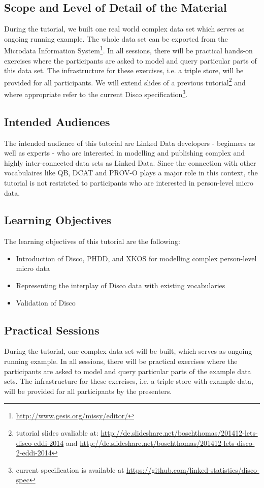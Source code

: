 \documentclass{llncs}
\begin{document}
\subsection{Scope and Level of Detail of the Material}

During the tutorial, we built one real world complex data set which serves as ongoing running example. 
The whole data set can be exported from the Microdata Information System\footnote{\url{http://www.gesis.org/missy/editor/}}. 
In all sessions, there will be practical hands-on exercises where the participants are asked to model and query particular parts of this data set. 
The infrastructure for these exercises, i.e. a triple store, will be provided for all participants.
We will extend slides of a previous tutorial\footnote{tutorial slides avaliable at: \url{http://de.slideshare.net/boschthomas/201412-lets-disco-eddi-2014} and \url{http://de.slideshare.net/boschthomas/201412-lets-disco-2-eddi-2014}} 
and where appropriate refer to the current Disco specification\footnote{current specification is available at \url{https://github.com/linked-statistics/disco-spec}}.

\subsection{Intended Audiences}
The intended audience of this tutorial are Linked Data developers - beginners as well as experts - who are interested in modelling and publishing complex and highly inter-connected data sets as Linked Data. Since the connection with other vocabulaires like QB, DCAT and PROV-O plays a major role in this context, the tutorial is not restricted to participants who are interested in person-level micro data.

\subsection{Learning Objectives}
The learning objectives of this tutorial are the following:
\begin{itemize} 
\item Introduction of Disco, PHDD, and XKOS for modelling complex person-level micro data
\item Representing the interplay of Disco data with existing vocabularies
\item Validation of Disco
\end{itemize}

\subsection{Practical Sessions}
During the tutorial, one complex data set will be built, which serves as ongoing running example. In all sessions, there will be practical exercises where the participants are asked to model and query particular parts of the example data sets. The infrastructure for these exercises, i.e. a triple store with example data, will be provided for all participants by the presenters.
\end{document}
